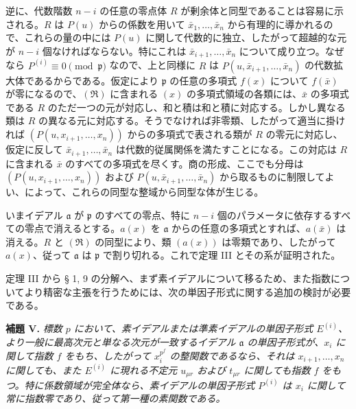 \documentclass[11pt]{article}
\providecommand{\mR}{\mathfrak{R}}
\providecommand{\frakp}{\mathfrak p}
\providecommand{\fraka}{\mathfrak a}
\providecommand{\mR}{\mathfrak{R}}
\providecommand{\frakp}{\mathfrak p}
\begin{document}
逆に、代数階数 $n-i$ の任意の零点体 $R$ が剰余体と同型であることは容易に示される。$R$ は $P(u)$ からの係数を用いて $\bar{x}_1,\ldots,\bar{x}_n$ から有理的に導かれるので、これらの量の中には $P(u)$ に関して代数的に独立、したがって超越的な元が $n-i$ 個なければならない。特にこれは $\bar{x}_{i+1},\ldots,\bar{x}_n$ について成り立つ。なぜなら $P^{(i)}\equiv0\pmod{\frakp}$ なので、上と同様に $R$ は $P(u,\bar{x}_{i+1},\ldots,\bar{x}_n)$ の代数拡大体であるからである。仮定により $\frakp$ の任意の多項式 $f(x)$ について $f(\bar{x})$ が零になるので、$(\mR)$ に含まれる $(x)$ の多項式領域の各類には、$\bar{x}$ の多項式である $R$ のただ一つの元が対応し、和と積は和と積に対応する。しかし異なる類は $R$ の異なる元に対応する。そうでなければ非零類、したがって適当に掛ければ $(P(u,x_{i+1},\ldots,x_n))$ からの多項式で表される類が $R$ の零元に対応し、仮定に反して $\bar{x}_{i+1},\ldots,\bar{x}_n$ は代数的従属関係を満たすことになる。この対応は $R$ に含まれる $\bar{x}$ のすべての多項式を尽くす。商の形成、ここでも分母は $(P(u,x_{i+1},\ldots,x_n))$ および $P(u,\bar{x}_{i+1},\ldots,\bar{x}_n)$ から取るものに制限してよい、によって、これらの同型な整域から同型な体が生じる。

いまイデアル $\fraka$ が $\frakp$ のすべての零点、特に $n-i$ 個のパラメータに依存するすべての零点で消えるとする。$a(x)$ を $\fraka$ からの任意の多項式とすれば、$a(\bar{x})$ は消える。$R$ と $(\mR)$ の同型により、類 $(a(x))$ は零類であり、したがって $a(x)$、従って $\fraka$ は $\frakp$ で割り切れる。これで定理 III とその系が証明された。

定理 III から § 1, 9 の分解へ、まず素イデアルについて移るため、また指数についてより精密な主張を行うためには、次の単因子形式に関する追加の検討が必要である。

\textbf{補題 V.} \emph{標数 $p$ において、素イデアルまたは準素イデアルの単因子形式 $E^{(i)}$、より一般に最高次元と単なる次元が一致するイデアル $\fraka$ の単因子形式が、$x_i$ に関して指数 $f$ をもち、したがって $x_i^{p^f}$ の整関数であるなら、それは $x_{i+1},\ldots,x_n$ に関しても、また $E^{(i)}$ に現れる不定元 $u_{\mu r}$ および $t_{\mu r}$ に関しても指数 $f$ をもつ。特に係数領域が完全体なら、素イデアルの単因子形式 $P^{(i)}$ は $x_i$ に関して常に指数零であり、従って第一種の素関数である。}
\end{document}

